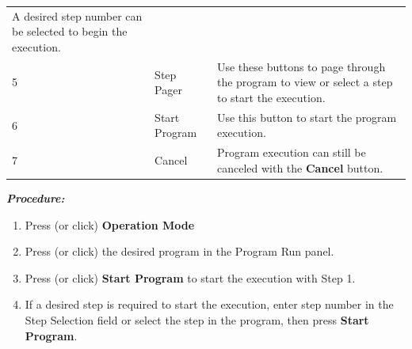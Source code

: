 \begin{longtable}[]{@{}lll@{}}
\begin{minipage}[t]{0.49\columnwidth}
A desired step number can be selected to begin the execution.\strut
\end{minipage}\tabularnewline
\begin{minipage}[t]{0.19\columnwidth}\raggedright
5\strut
\end{minipage} & \begin{minipage}[t]{0.23\columnwidth}\raggedright
Step Pager\strut
\end{minipage} & \begin{minipage}[t]{0.49\columnwidth}\raggedright
Use these buttons to page through the program to view or select a step
to start the execution.\strut
\end{minipage}\tabularnewline
\begin{minipage}[t]{0.19\columnwidth}\raggedright
6\strut
\end{minipage} & \begin{minipage}[t]{0.23\columnwidth}\raggedright
Start Program\strut
\end{minipage} & \begin{minipage}[t]{0.49\columnwidth}\raggedright
Use this button to start the program execution.\strut
\end{minipage}\tabularnewline
\begin{minipage}[t]{0.19\columnwidth}\raggedright
7\strut
\end{minipage} & \begin{minipage}[t]{0.23\columnwidth}\raggedright
Cancel\strut
\end{minipage} & \begin{minipage}[t]{0.49\columnwidth}\raggedright
Program execution can still be canceled with the \textbf{Cancel}
button.\strut
\end{minipage}\tabularnewline
\bottomrule
\end{longtable}

\textbf{\emph{Procedure:}}

\begin{enumerate}
\def\labelenumi{\arabic{enumi}.}
\tightlist
\item
  Press (or click) \textbf{Operation Mode}
\item
  Press (or click) the desired program in the Program Run panel.
\item
  Press (or click) \textbf{Start Program} to start the execution with
  Step 1.
\item
  If a desired step is required to start the execution, enter step
  number in the Step Selection field or select the step in the program,
  then press \textbf{Start Program}.
\end{enumerate}

